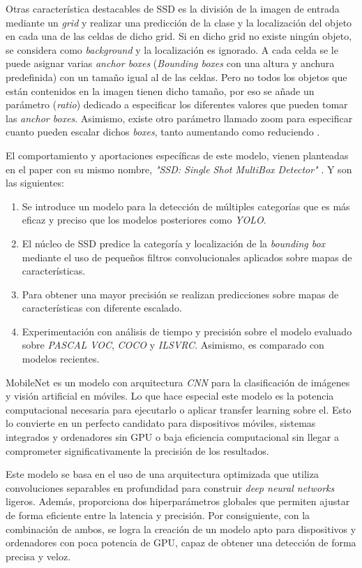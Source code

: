 Otras característica destacables de SSD es la división de la imagen de entrada mediante un \textit{grid} y realizar una predicción de la clase y la localización del objeto en cada una de las celdas de dicho grid. Si en dicho grid no existe ningún objeto, se considera como \textit{background} y la localización es ignorado. A cada celda se le puede asignar varias \textit{anchor boxes} (\textit{Bounding boxes} con una altura y anchura predefinida) con un tamaño igual al de las celdas. Pero no todos los objetos que están contenidos en la imagen tienen dicho tamaño, por eso se añade un parámetro (\textit{ratio}) dedicado a especificar los diferentes valores que pueden tomar las \textit{anchor boxes}. Asimismo, existe otro parámetro llamado zoom para especificar cuanto pueden escalar dichos \textit{boxes}, tanto aumentando como reduciendo \cite{ssdwork}.

El comportamiento y aportaciones específicas de este modelo, vienen planteadas en el paper con su mismo nombre, \textit{"SSD: Single Shot MultiBox Detector"} \cite{ssd}. Y son las siguientes:

\begin{enumerate}
	\item Se introduce un modelo para la detección de múltiples categorías que es más eficaz y preciso que los modelos posteriores como \textit{YOLO}.
	\item El núcleo de SSD predice la categoría y localización de la \textit{bounding box} mediante el uso de pequeños filtros convolucionales aplicados sobre mapas de características.
	\item Para obtener una mayor precisión se realizan predicciones sobre mapas de características con diferente escalado.
	\item Experimentación con análisis de tiempo y precisión sobre el modelo evaluado sobre \textit{PASCAL VOC}, \textit{COCO} y \textit{ILSVRC}. Asimismo, es comparado con modelos recientes.
\end{enumerate}

MobileNet es un modelo con arquitectura \textit{CNN} para la clasificación de imágenes y visión artificial en móviles. Lo que hace especial este modelo es la potencia computacional necesaria para ejecutarlo o aplicar transfer learning sobre el. Esto lo convierte en un perfecto candidato para dispositivos móviles, sistemas integrados y ordenadores sin GPU o baja eficiencia computacional sin llegar a comprometer significativamente la precisión de los resultados.

Este modelo se basa en el uso de una arquitectura optimizada que utiliza convoluciones separables en profundidad para construir \textit{deep neural networks} ligeros. Además, proporciona dos hiperparámetros globales que permiten ajustar de forma eficiente entre la latencia y precisión. Por consiguiente, con la combinación de ambos, se logra la creación de un modelo apto para dispositivos y ordenadores con poca potencia de GPU, capaz de obtener una detección de forma precisa y veloz.


